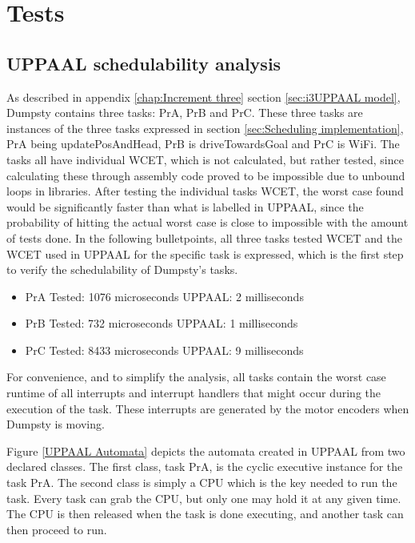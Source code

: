 \chapter{Tests}
\label{chap:Tests}


\section{UPPAAL schedulability analysis}
\label{sec:UPPAAL schedulability}
As described in appendix \ref{chap:Increment three} section  \ref{sec:i3UPPAAL model}, Dumpsty contains three tasks: PrA, PrB and PrC. These three tasks are instances of the three tasks expressed in section \ref{sec:Scheduling implementation}, PrA being updatePosAndHead, PrB is driveTowardsGoal and PrC is WiFi.
The tasks all have individual WCET, which is not calculated, but rather tested, since calculating these through assembly code proved to be impossible due to unbound loops in libraries. After testing the individual tasks WCET, the worst case found would be significantly faster than what is labelled in UPPAAL, since the probability of hitting the actual worst case is close to impossible with the amount of tests done. In the following bulletpoints, all three tasks tested WCET and the WCET used in UPPAAL for the specific task is expressed, which is the first step to verify the schedulability of Dumpsty's tasks.


\begin{itemize}
	\item PrA \tab Tested: 1076 microseconds \tab UPPAAL: 2 milliseconds
	\item PrB \tab Tested: 732  microseconds \tab UPPAAL: 1 milliseconds
	\item PrC \tab	Tested: 8433 microseconds \tab UPPAAL: 9 milliseconds
\end{itemize}


For convenience, and to simplify the analysis, all tasks contain the worst case runtime of all interrupts and interrupt handlers that might occur during the execution of the task. These interrupts are generated by the motor encoders when Dumpsty is moving.


Figure \ref{UPPAAL Automata} depicts the automata created in UPPAAL from two declared classes. The first class, task PrA, is the cyclic executive instance for the task PrA. The second class is simply a CPU which is the key needed to run the task. Every task can grab the CPU, but only one may hold it at any given time. The CPU is then released when the task is done executing, and another task can then proceed to run.


